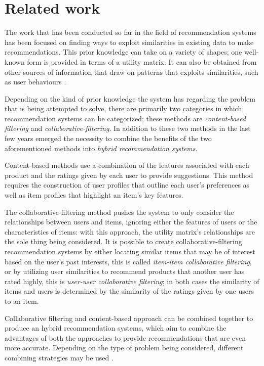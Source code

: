 \section{Related work}

The work that has been conducted so far in the field of recommendation systems has been focused on finding ways to exploit similarities in existing data to make recommendations. This prior knowledge can take on a variety of shapes; one well-known form is provided in terms of a utility matrix. It can also be obtained from other sources of information that draw on patterns that exploits similarities, such as user behaviours \cite{user_behaviour_rec}. 


Depending on the kind of prior knowledge the system has regarding the problem that is being attempted to solve, there are primarily two categories in which recommendation systems can be categorized; these methods are \emph{content-based filtering} and \emph{collaborative-filtering}. In addition to these two methods in the last few years emerged the necessity to combine the benefits of the two aforementioned methods into \emph{hybrid recommendation systems}.

Content-based methods use a combination of the features associated with each product and the ratings given by each user to provide suggestions. This method requires the construction of user profiles that outline each user's preferences as well as item profiles that highlight an item's key features. 

The collaborative-filtering method pushes the system to only consider the relationships between users and items, ignoring either the features of users or the characteristics of items: with this approach, the utility matrix's relationships are the sole thing being considered. It is possible to create collaborative-filtering recommendation systems by either locating similar items that may be of interest based on the user's past interests, this is called \emph{item-item collaborative filtering}, or by utilizing user similarities to recommend products that another user has rated highly, this is \emph{user-user collaborative filtering}; in both cases the similarity of items and users is determined by the similarity of the ratings given by one users to an item. 

Collaborative filtering and content-based approach can be combined together to produce an hybrid recommendation systems, which aim to combine the advantages of both the approaches to provide recommendations that are even more accurate. Depending on the type of problem being considered, different combining strategies may be used \cite{user_behaviour_rec}.  

